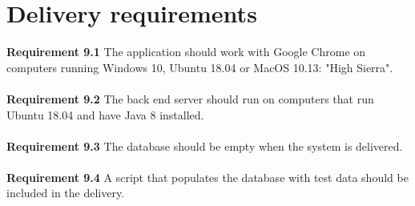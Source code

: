 \documentclass{article}
\begin{document}
\section{Delivery requirements}
\textbf{Requirement 9.1} The application should work with Google Chrome on computers running Windows 10, Ubuntu 18.04 or MacOS 10.13: "High Sierra".
\\ \\
\textbf{Requirement 9.2} The back end server should run on computers that run Ubuntu 18.04 and have Java 8 installed.
\\ \\ 
\textbf{Requirement 9.3} The database should be empty when the system is delivered.
\\ \\
\textbf{Requirement 9.4} A script that populates the database with test data should be included in the delivery.
\end{document}
